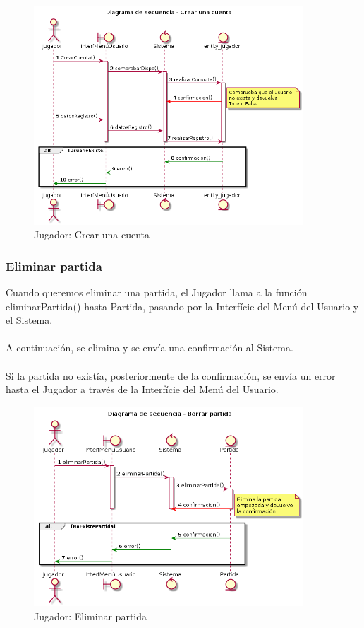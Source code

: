 \begin{figure}[ht]
 \centering
 	  \includegraphics[width=0.9\textwidth]{./imatges/jugador/Crear_una_cuenta.png}
 \caption{Jugador: Crear una cuenta}
 \end{figure} 
  
  
\newpage
\subsubsection{Eliminar partida}
  Cuando queremos eliminar una partida, el Jugador llama a la función eliminarPartida() hasta Partida, pasando por la Interfície del Menú del Usuario y el Sistema. \\
  \\A continuación, se elimina y se envía una confirmación al Sistema.\\
  \\Si la partida no existía, posteriormente de la confirmación, se envía un error hasta el Jugador a través de la Interfície del Menú del Usuario.
  
\begin{figure}[ht]
 \centering
 	  \includegraphics[width=0.9\textwidth]{./imatges/jugador/Eliminar_partida.png}
 \caption{Jugador: Eliminar partida}
 \end{figure} 
  
